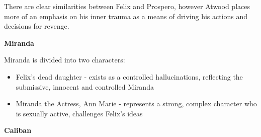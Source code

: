 			There are clear similarities between Felix and Prospero, however Atwood places more of an emphasis on his inner trauma as a means of driving his actions and decisions for revenge.

		\textbf{Miranda}

			Miranda is divided into two characters:

			\begin{itemize}
				\item Felix's dead daughter - exists as a controlled hallucinations, reflecting the submissive, innocent and controlled Miranda
				\item Miranda the Actress, Ann Marie - represents a strong, complex character who is sexually active, challenges Felix's ideas
			\end{itemize}

		\textbf{Caliban}
